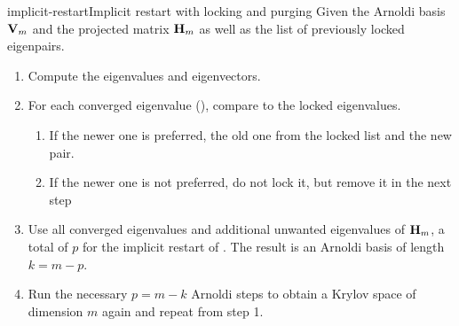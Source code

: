 

\begin{Algorithm*}{implicit-restart}{Implicit restart with locking and purging}
  Given the Arnoldi basis $\mathbf V_m$ and the projected matrix $\mathbf H_m$
  as well as the list of previously locked eigenpairs.
  \begin{enumerate}
  \item Compute the eigenvalues and eigenvectors.
  \item For each converged eigenvalue (), compare to the locked eigenvalues.
  \begin{enumerate}
  \item If the newer one is preferred,  the old one from the locked list and  the new pair.
  \item If the newer one is not preferred, do not lock it, but remove
    it in the next step
  \end{enumerate}
\item Use all converged eigenvalues and additional unwanted
  eigenvalues of $\mathbf H_m$, a total of $p$ for the implicit restart of
  . The result is an Arnoldi basis
  of length $k=m-p$.
\item Run the necessary $p=m-k$ Arnoldi steps to obtain a Krylov space of
  dimension $m$ again and repeat from step 1.
  \end{enumerate}
\end{Algorithm*}

